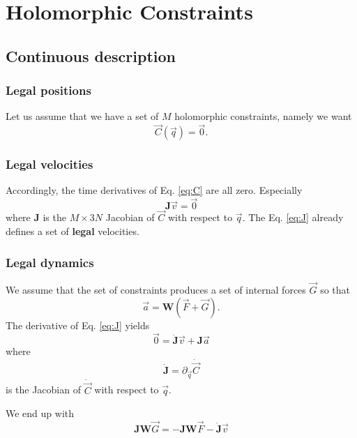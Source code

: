 \documentclass[aps,twocolumn]{revtex4}
\newcommand{\mymat}[1]{\boldsymbol{#1}}
\begin{document}
\section{Holomorphic Constraints}
\subsection{Continuous description}
\subsubsection{Legal positions}

Let us assume that we have a set of $M$ holomorphic constraints, namely we want
\begin{equation}
	\label{eq:C}
	\vec{C}\left(\vec{q}\right) = \vec{0}.
\end{equation}

\subsubsection{Legal velocities}
Accordingly, the time derivatives of Eq. \eqref{eq:C} are all zero.
Especially
\begin{equation}
	\label{eq:J}
	\mymat{J}\vec{v} = \vec{0}
\end{equation}
where $\mymat{J}$ is the $M\times 3N$ Jacobian of $\vec{C}$ with respect to $\vec{q}$.
The Eq. \eqref{eq:J} already defines a set of \textbf{legal} velocities.

\subsubsection{Legal dynamics}
We assume that the set of constraints produces a set of internal forces $\vec{G}$ so that
\begin{equation}
	\vec{a} = \mymat{W} \left( \vec{F} + \vec{G} \right).
\end{equation}
The derivative of Eq. \eqref{eq:J} yields
\begin{equation}
	\vec{0} = \dot{\mymat{J}}\vec{v} + \mymat{J}\vec{a}
\end{equation}
where
\begin{equation}
	\dot{\mymat{J}} = \partial_{\vec{q}} \dot{\vec{C}}
\end{equation}
is the Jacobian of $\dot{\vec{C}}$ with respect to $\vec{q}$.

We end up with
\begin{equation}
\label{eq:JW}
	\mymat{J}\mymat{W}\vec{G} = 
	-\mymat{J}\mymat{W}\vec{F} - \dot{\mymat{J}}\vec{v}
\end{equation}
\end{document}
